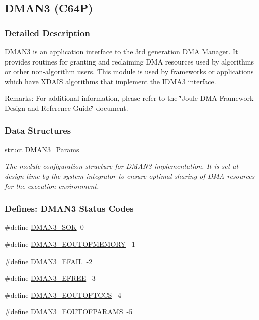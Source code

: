 \hypertarget{group___d_s_p_d_m_a_n3}{
\subsection{DMAN3 (C64P)}
\label{group___d_s_p_d_m_a_n3}
}


\subsubsection{Detailed Description}
DMAN3 is an application interface to the 3rd generation DMA Manager. It provides routines for granting and reclaiming DMA resources used by algorithms or other non-algorithm users. This module is used by frameworks or applications which have XDAIS algorithms that implement the IDMA3 interface.

\begin{Desc}
\item[Remarks:]For additional information, please refer to the \char`\"{}Joule DMA Framework Design and Reference Guide\char`\"{} document. \end{Desc}


\subsubsection*{Data Structures}
\begin{CompactItemize}
\item 
struct \hyperlink{struct_d_m_a_n3___params}{DMAN3\_\-Params}
\begin{CompactList}\small\item\em The module configuration structure for DMAN3 implementation. It is set at design time by the system integrator to ensure optimal sharing of DMA resources for the execution environment. \item\end{CompactList}\end{CompactItemize}
\subsubsection*{Defines: DMAN3 Status Codes}
\begin{CompactItemize}
\item 
\#define \hyperlink{group___d_s_p_d_m_a_n3_g462d3887266b42b69cf21c65e87dc99d}{DMAN3\_\-SOK}~0
\item 
\#define \hyperlink{group___d_s_p_d_m_a_n3_g70d091dae946805ff49ab47b903483a7}{DMAN3\_\-EOUTOFMEMORY}~-1
\item 
\#define \hyperlink{group___d_s_p_d_m_a_n3_ge81e9235f9755ac2e6a6279401c8798d}{DMAN3\_\-EFAIL}~-2
\item 
\#define \hyperlink{group___d_s_p_d_m_a_n3_g097f382f6603cc69c2d998c0ce6b9dfe}{DMAN3\_\-EFREE}~-3
\item 
\#define \hyperlink{group___d_s_p_d_m_a_n3_gb04511fe9f738b3a189758163e75f1d2}{DMAN3\_\-EOUTOFTCCS}~-4
\item 
\#define \hyperlink{group___d_s_p_d_m_a_n3_g45977d32b34b6e98e33b6510c9164dee}{DMAN3\_\-EOUTOFPARAMS}~-5
\end{CompactItemize}
